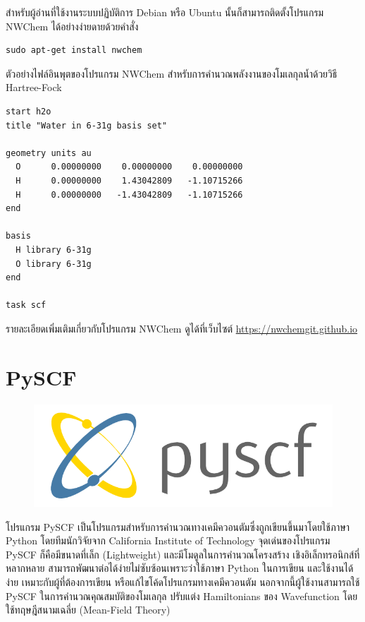 สำหรับผู้อ่านที่ใช้งานระบบปฏิบัติการ Debian หรือ Ubuntu นั้นก็สามารถติดตั้งโปรแกรม NWChem ได้อย่างง่ายดายด้วยคำสั่ง

\begin{lstlisting}[style=MyBash]
sudo apt-get install nwchem
\end{lstlisting}

\vspace{1em}

ตัวอย่างไฟล์อินพุตของโปรแกรม NWChem สำหรับการคำนวณพลังงานของโมเลกุลน้ำด้วยวิธี Hartree-Fock

\begin{lstlisting}[style=plain]
start h2o 
title "Water in 6-31g basis set" 

geometry units au  
  O      0.00000000    0.00000000    0.00000000  
  H      0.00000000    1.43042809   -1.10715266  
  H      0.00000000   -1.43042809   -1.10715266 
end  

basis  
  H library 6-31g  
  O library 6-31g  
end

task scf
\end{lstlisting}

\vspace{1em}

รายละเอียดเพิ่มเติมเกี่ยวกับโปรแกรม NWChem ดูได้ที่เว็บไซต์ \url{https://nwchemgit.github.io}

\section{PySCF}
\label{sec:software_pyscf}

\begin{figure}[H]
    \centering
    \includegraphics[width=0.5\linewidth]{fig/logo_pyscf.png}
    \label{fig:logo_pyscf}
\end{figure}

โปรแกรม PySCF เป็นโปรแกรมสำหรับการคำนวณทางเคมีควอนตัมซึ่งถูกเขียนขึ้นมาโดยใช้ภาษา Python โดยทีมนักวิจัยจาก California Institute 
of Technology\autocite{sun2018} จุดเด่นของโปรแกรม PySCF ก็คือมีขนาดที่เล็ก (Lightweight) และมีโมดูลในการคำนวณโครงสร้าง%
เชิงอิเล็กทรอนิกส์ที่หลากหลาย สามารถพัฒนาต่อได้ง่ายไม่ซับซ้อนเพราะว่าใช้ภาษา Python ในการเขียน และใช้งานได้ง่าย เหมาะกับผู้ที่ต้องการเขียน%
หรือแก้ไขโค้ดโปรแกรมทางเคมีควอนตัม นอกจากนี้ผู้ใช้งานสามารถใช้ PySCF ในการคำนวณคุณสมบัติของโมเลกุล ปรับแต่ง Hamiltonians ของ 
Wavefunction โดยใช้ทฤษฎีสนามเฉลี่ย (Mean-Field Theory)

